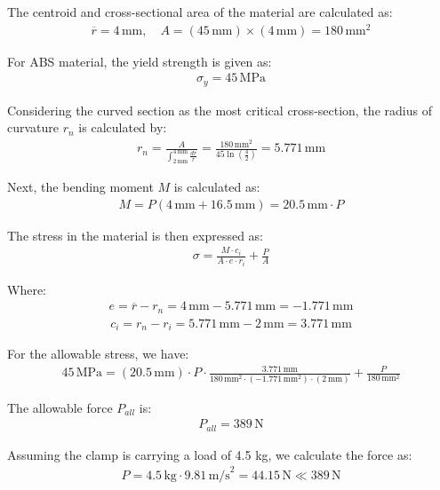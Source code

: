 \documentclass[12pt]{article}
\begin{document}
The centroid and cross-sectional area of the material are calculated as:
\begin{align}
\overline{r} = 4 \, \text{mm}, \quad A = (45 \, \text{mm}) \times (4 \, \text{mm}) = 180 \, \text{mm}^2
\end{align}

For ABS material, the yield strength is given as:
\begin{align}
\sigma_y = 45 \, \text{MPa}
\end{align}

Considering the curved section as the most critical cross-section, the radius of curvature \( r_n \) is calculated by:
\begin{align}
r_n = \frac{A}{\int_{2 \, \text{mm}}^{4 \, \text{mm}} \frac{dr}{r}} = \frac{180 \, \text{mm}^2}{45 \ln \left( \frac{4}{2} \right)} = 5.771 \, \text{mm}
\end{align}

Next, the bending moment \( M \) is calculated as:
\begin{align}
M = P(4 \, \text{mm} + 16.5 \, \text{mm}) = 20.5 \, \text{mm} \cdot P
\end{align}

The stress in the material is then expressed as:
\begin{align}
\sigma = \frac{M \cdot c_i}{A \cdot e \cdot r_i} + \frac{P}{A}
\end{align}

Where:
\begin{align}
e = \overline{r} - r_n = 4 \, \text{mm} - 5.771 \, \text{mm} = -1.771 \, \text{mm}
\end{align}
\begin{align}
c_i = r_n - r_i = 5.771 \, \text{mm} - 2 \, \text{mm} = 3.771 \, \text{mm}
\end{align}

For the allowable stress, we have:
\begin{align}
45 \, \text{MPa} = (20.5 \, \text{mm}) \cdot P \cdot \frac{3.771 \, \text{mm}}{180 \, \text{mm}^2 \cdot (-1.771 \, \text{mm}^2) \cdot (2 \, \text{mm})} + \frac{P}{180 \, \text{mm}^2}
\end{align}

The allowable force \( P_{all} \) is:
\begin{align}
P_{all} = 389 \, \text{N}
\end{align}

Assuming the clamp is carrying a load of 4.5 kg, we calculate the force as:
\begin{align}
P = 4.5 \, \text{kg} \cdot 9.81 \, \text{m/s}^2 = 44.15 \, \text{N} \ll 389 \, \text{N}
\end{align}
\end{document}
